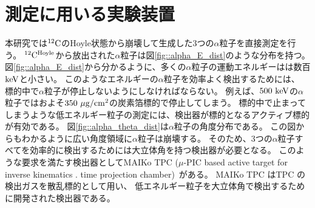\section{測定に用いる実験装置}
本研究では${}^{12}{\rm C}$のHoyle状態から崩壊して生成した3つの$\alpha$粒子を直接測定を行う。
${}^{12}{\rm C}^{\rm Hoyle}$から放出された$\alpha$粒子は図\ref{fig::alpha_E_dist}のような分布を持つ。
図\ref{fig::alpha_E_dist}から分かるように、多くの$\alpha$粒子の運動エネルギーはは数百${\rm keV}$と小さい。
このようなエネルギーの$\alpha$粒子を効率よく検出するためには、
標的中で$\alpha$粒子が停止しないようにしなければならない。
例えば、$500~{\rm keV}$の$\alpha$粒子ではおよそ$350~{\rm \mu g/cm^2}$の炭素箔標的で停止してしまう。
標的中で止まってしまうような低エネルギー粒子の測定には、検出器が標的となるアクティブ標的が有効である。
図\ref{fig::alpha_theta_dist}は$\alpha$粒子の角度分布である。
この図からもわかるように広い角度領域に$\alpha$粒子は崩壊する。
そのため、3つの$\alpha$粒子すべてを効率的に検出するためには大立体角を持つ検出器が必要となる。
このような要求を満たす検出器としてMAIKo TPC ($\mu$-PIC based active target for inverse kinematics .
time projection chamber)~\cite{maiko, mupic}がある。
MAIKo TPC はTPC の検出ガスを散乱標的として用い、
低エネルギー粒子を大立体角で検出するために開発された検出器である。
